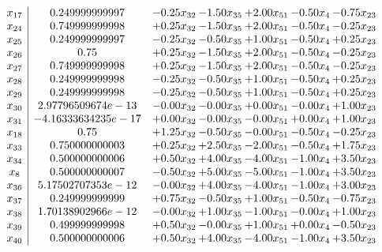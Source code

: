 \documentclass[8pt]{article}
\begin{document}
\[\begin{array}{c| c c@{\hskip 2pt} c@{\hskip 2pt} c@{\hskip 2pt} c@{\hskip 2pt} c@{\hskip 2pt} }
 x_{17}   &  0.249999999997 & -0.25 x_{32} & -1.50 x_{35} & +  2.00 x_{51} & -0.50 x_{4} & -0.75 x_{23}\\
 x_{24}   &  0.749999999998 & +  0.25 x_{32} & -1.50 x_{35} & +  2.00 x_{51} & -0.50 x_{4} & -0.25 x_{23}\\
 x_{25}   &  0.249999999997 & -0.25 x_{32} & -0.50 x_{35} & +  1.00 x_{51} & -0.50 x_{4} & +  0.25 x_{23}\\
 x_{26}   &  0.75 & +  0.25 x_{32} & -1.50 x_{35} & +  2.00 x_{51} & -0.50 x_{4} & -0.25 x_{23}\\
 x_{27}   &  0.749999999998 & +  0.25 x_{32} & -1.50 x_{35} & +  2.00 x_{51} & -0.50 x_{4} & -0.25 x_{23}\\
 x_{28}   &  0.249999999998 & -0.25 x_{32} & -0.50 x_{35} & +  1.00 x_{51} & -0.50 x_{4} & +  0.25 x_{23}\\
 x_{29}   &  0.249999999998 & -0.25 x_{32} & -0.50 x_{35} & +  1.00 x_{51} & -0.50 x_{4} & +  0.25 x_{23}\\
 x_{30}   &  2.97796509674e-13 & -0.00 x_{32} & -0.00 x_{35} & +  0.00 x_{51} & -0.00 x_{4} & +  1.00 x_{23}\\
 x_{31}   &  -4.16333634235e-17 & +  0.00 x_{32} & -0.00 x_{35} & -0.00 x_{51} & +  0.00 x_{4} & +  1.00 x_{23}\\
 x_{18}   &  0.75 & +  1.25 x_{32} & -0.50 x_{35} & -0.00 x_{51} & -0.50 x_{4} & -0.25 x_{23}\\
 x_{33}   &  0.750000000003 & +  0.25 x_{32} & +  2.50 x_{35} & -2.00 x_{51} & -0.50 x_{4} & +  1.75 x_{23}\\
 x_{34}   &  0.500000000006 & +  0.50 x_{32} & +  4.00 x_{35} & -4.00 x_{51} & -1.00 x_{4} & +  3.50 x_{23}\\
 x_{8}   &  0.500000000007 & -0.50 x_{32} & +  5.00 x_{35} & -5.00 x_{51} & -1.00 x_{4} & +  3.50 x_{23}\\
 x_{36}   &  5.17502707353e-12 & -0.00 x_{32} & +  4.00 x_{35} & -4.00 x_{51} & -1.00 x_{4} & +  3.00 x_{23}\\
 x_{37}   &  0.249999999999 & +  0.75 x_{32} & -0.50 x_{35} & +  1.00 x_{51} & -0.50 x_{4} & -0.75 x_{23}\\
 x_{38}   &  1.70138902966e-12 & -0.00 x_{32} & +  1.00 x_{35} & -1.00 x_{51} & -0.00 x_{4} & +  1.00 x_{23}\\
 x_{39}   &  0.499999999998 & +  0.50 x_{32} & -0.00 x_{35} & +  1.00 x_{51} & +  0.00 x_{4} & -0.50 x_{23}\\
 x_{40}   &  0.500000000006 & +  0.50 x_{32} & +  4.00 x_{35} & -4.00 x_{51} & -1.00 x_{4} & +  3.50 x_{23}\\

\end{array}\]
\end{document}
